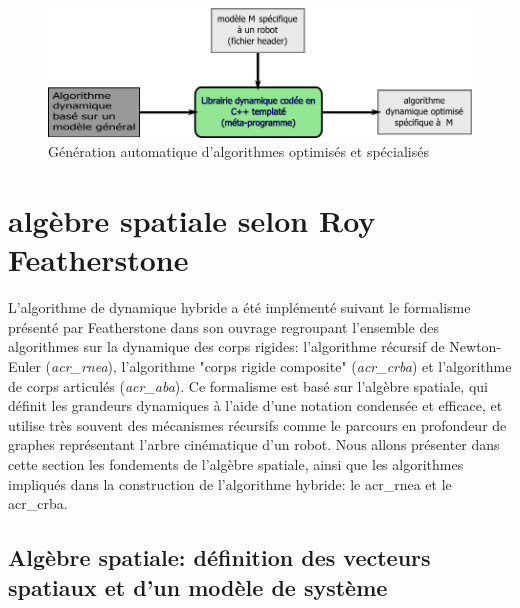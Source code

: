 \documentclass{report}
\begin{document}
\begin{figure}[H]
\centering
\includegraphics[width=\textwidth]{figs/principeAlgoGenerique.pdf}
\caption{Génération automatique d'algorithmes optimisés et spécialisés}
\end{figure}



\chapter{algèbre spatiale selon Roy Featherstone}


L'algorithme de dynamique hybride a été implémenté suivant le formalisme présenté par Featherstone dans son ouvrage \cite{Featherstone} regroupant l'ensemble des algorithmes sur la dynamique des corps rigides: l'algorithme récursif de Newton-Euler (\emph{\gls{acr_rnea}}), l'algorithme "corps rigide composite" (\emph{\gls{acr_crba}}) et l'algorithme de corps articulés (\emph{\gls{acr_aba}}). Ce formalisme est basé sur l'algèbre spatiale, qui définit les grandeurs dynamiques à l'aide d'une notation condensée et efficace, et utilise très souvent des mécanismes récursifs comme le parcours en profondeur de graphes représentant l'arbre cinématique d'un robot. Nous allons présenter dans cette section les fondements de l'algèbre spatiale, ainsi que les algorithmes impliqués dans la construction de l'algorithme hybride: le \gls{acr_rnea} et le \gls{acr_crba}.\\


\section{Algèbre spatiale: définition des vecteurs spatiaux et d'un modèle de système}
\end{document}

